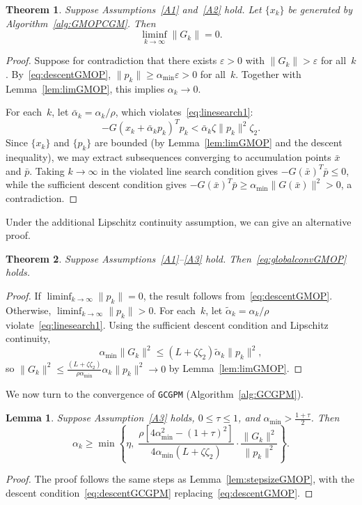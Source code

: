 \documentclass{article}
\theoremstyle{plain}
\newtheorem{theorem}{Theorem}
\newtheorem{lemma}{Lemma}
\theoremstyle{definition}
\theoremstyle{remark}
\newcommand{\norm}[1]{\|#1\|}
\newcommand{\algoname}[1]{{\small\texttt{#1}}}
\newcommand{\GCGPM}{\algoname{GCGPM}}
\begin{document}
\begin{theorem}\label{thm:convergenceGMOP}
Suppose Assumptions~\ref{A1} and~\ref{A2} hold. Let $\{x_k\}$ be generated by Algorithm~\ref{alg:GMOPCGM}. Then
\begin{equation}\label{eq:globalconvGMOP}
  \liminf_{k \to \infty}\norm{G_k} = 0.
\end{equation}
\end{theorem}
\begin{proof}
Suppose for contradiction that there exists $\varepsilon > 0$ with $\norm{G_k} > \varepsilon$ for all~$k$. By~\eqref{eq:descentGMOP}, $\norm{p_k} \geq \alpha_{\min}\varepsilon > 0$ for all~$k$. Together with Lemma~\ref{lem:limGMOP}, this implies $\alpha_k \to 0$.

For each~$k$, let $\bar{\alpha}_k = \alpha_k/\rho$, which violates~\eqref{eq:linesearch1}:
\[
  -G(x_k + \bar{\alpha}_k p_k)^T p_k < \bar{\alpha}_k\zeta\norm{p_k}^2\zeta_2.
\]
Since $\{x_k\}$ and $\{p_k\}$ are bounded (by Lemma~\ref{lem:limGMOP} and the descent inequality), we may extract subsequences converging to accumulation points $\bar{x}$ and $\bar{p}$. Taking $k \to \infty$ in the violated line search condition gives $-G(\bar{x})^T\bar{p} \leq 0$, while the sufficient descent condition gives $-G(\bar{x})^T\bar{p} \geq \alpha_{\min}\norm{G(\bar{x})}^2 > 0$, a contradiction.
\end{proof}

Under the additional Lipschitz continuity assumption, we can give an alternative proof.

\begin{theorem}\label{thm:convergenceGMOP_Lip}
Suppose Assumptions~\ref{A1}--\ref{A3} hold. Then~\eqref{eq:globalconvGMOP} holds.
\end{theorem}
\begin{proof}
If $\liminf_{k\to\infty}\norm{p_k} = 0$, the result follows from~\eqref{eq:descentGMOP}. Otherwise, $\liminf_{k\to\infty}\norm{p_k} > 0$. For each~$k$, let $\tilde{\alpha}_k = \alpha_k/\rho$ violate~\eqref{eq:linesearch1}. Using the sufficient descent condition and Lipschitz continuity,
\[
  \alpha_{\min}\norm{G_k}^2 \leq (L + \zeta\zeta_2)\tilde{\alpha}_k\norm{p_k}^2,
\]
so $\norm{G_k}^2 \leq \frac{(L+\zeta\zeta_2)}{\rho\alpha_{\min}}\alpha_k\norm{p_k}^2 \to 0$ by Lemma~\ref{lem:limGMOP}.
\end{proof}

We now turn to the convergence of \GCGPM{} (Algorithm~\ref{alg:GCGPM}).

\begin{lemma}\label{lem:stepsizeGCGPM}
Suppose Assumption~\ref{A3} holds, $0 \leq \tau \leq 1$, and $\alpha_{\min} > \frac{1+\tau}{2}$. Then
\[
  \alpha_k \geq \min\!\left\{\eta,\; \frac{\rho[4\alpha_{\min}^2 - (1+\tau)^2]}{4\alpha_{\min}(L + \zeta\zeta_2)}\cdot\frac{\norm{G_k}^2}{\norm{p_k}^2}\right\}.
\]
\end{lemma}
\begin{proof}
The proof follows the same steps as Lemma~\ref{lem:stepsizeGMOP}, with the descent condition~\eqref{eq:descentGCGPM} replacing~\eqref{eq:descentGMOP}.
\end{proof}
\end{document}
